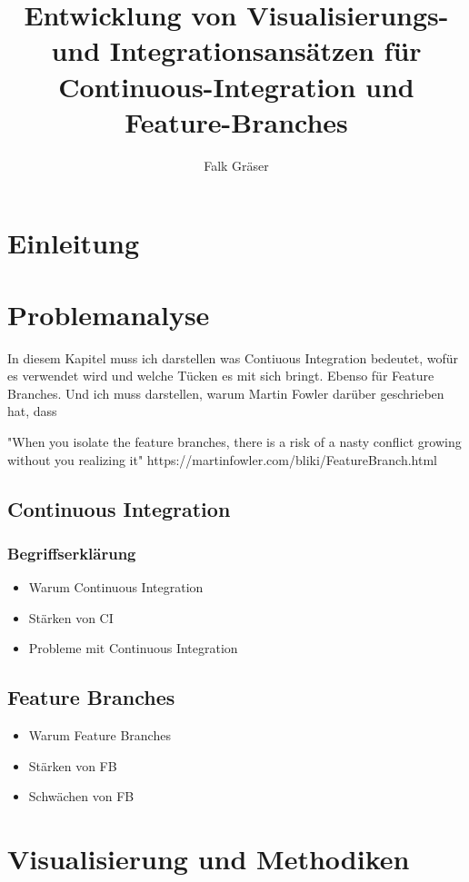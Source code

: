 \documentclass[10pt,a4paper]{book}
\author{Falk Gräser}
\title{Entwicklung von Visualisierungs- und Integrationsansätzen für Continuous-Integration und Feature-Branches}
\begin{document}
\maketitle

\newpage

\chapter{Einleitung}

\chapter{Problemanalyse}

In diesem Kapitel muss ich darstellen was Contiuous Integration bedeutet, wofür es verwendet wird und welche Tücken es mit sich bringt.
Ebenso für Feature Branches.
Und ich muss darstellen, warum Martin Fowler darüber geschrieben hat, dass 

"When you isolate the feature branches, there is a risk of a nasty conflict growing without you realizing it"
https://martinfowler.com/bliki/FeatureBranch.html


\section{Continuous Integration}
\subsection{Begriffserklärung}


\begin{itemize}
\item Warum Continuous Integration
\item Stärken von CI
\item Probleme mit Continuous Integration
\end{itemize}

\section{Feature Branches}

\begin{itemize}
\item Warum Feature Branches
\item Stärken von FB
\item Schwächen von FB
\end{itemize}

\chapter{Visualisierung und Methodiken}
\end{document}
